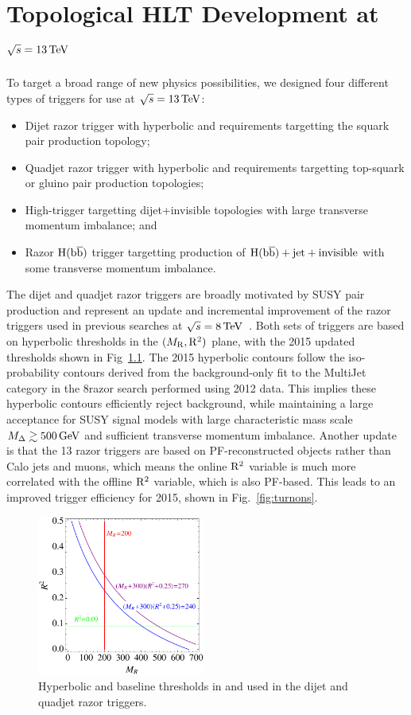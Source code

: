 \chapter{Topological HLT Development at $\sqrt{s}=13 \,\text{Te\hspace{-.08em}V}$}
\label{ch:hlt13TeV}

To target a broad range of new physics possibilities, we designed four different
types of triggers for use at $\sqrt{s}=13\,\text{Te\hspace{-.08em}V}$:
\begin{itemize}
\item Dijet razor trigger with hyperbolic \MR and \Rtwo requirements targetting the squark pair production topology;
\item Quadjet razor trigger with hyperbolic \MR and \Rtwo requirements
  targetting top-squark or gluino pair production topologies;
\item High-\Rtwo trigger targetting dijet+invisible topologies with
  large transverse momentum imbalance; and
\item Razor $\mathrm{H}(\mathrm{b}\overline{\mathrm{b}})$ trigger targetting production of
  $\mathrm{H}(\mathrm{b}\overline{\mathrm{b}})+\mathrm{jet}+\mathrm{invisible}$ with some transverse momentum imbalance.
\end{itemize}

The dijet and quadjet razor triggers are broadly motivated by SUSY pair
production and represent an update and incremental improvement of the razor triggers
used in previous searches at $\sqrt{s}=8\,\text{Te\hspace{-.08em}V}$~\cite{razor8TeV}. Both
sets of triggers are based on hyperbolic thresholds in the $(M_\mathrm{R},\mathrm{R}^2)$
plane, with the 2015 updated thresholds shown in
Fig~\ref{fig:hyperbolic}. The 2015 hyperbolic contours follow the
iso-probability contours derived from the background-only fit to the MultiJet category
in the 8\TeV razor search performed using 2012 data. This implies
these hyperbolic contours efficiently reject background, while
maintaining a large acceptance for SUSY signal models with large
characteristic mass scale $M_{\Delta}\gtrsim 500 \,\text{Ge\hspace{-.08em}V}$ and sufficient
transverse momentum imbalance. Another update is that the 13 \TeV razor triggers are based on PF-reconstructed objects rather
than Calo jets and muons, which means the online $\mathrm{R}^2$ variable is
much more correlated with the offline $\mathrm{R}^2$ variable, which is also
PF-based. This leads to an improved trigger efficiency for 2015, shown
in Fig.~\ref{fig:turnons}.

\begin{figure}[htb!]
\centering
\includegraphics[width=0.49\textwidth]{figs/hlt13TeV/HLTRsqMR.pdf}
\caption{\label{fig:hyperbolic} Hyperbolic and baseline thresholds in
  \Rtwo and \MR used in the dijet and quadjet razor triggers.}
\end{figure}

